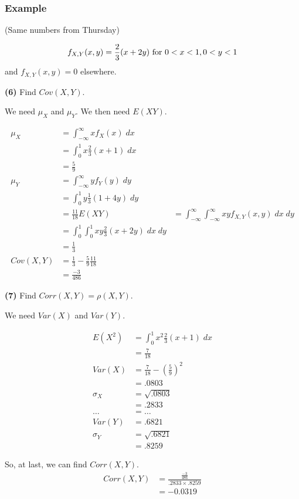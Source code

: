 \documentclass[12pt]{article}
\begin{document}
\subsubsection{Example}
(Same numbers from Thursday)

\[
    f_{X,Y} (x,y) = \frac{2}{3} (x + 2y) \textnormal{ for } 0 < x < 1, 0 < y < 1
\]
and $f_{X,Y} (x,y) = 0$ elsewhere.

\textbf{(6)} Find $Cov(X,Y)$.

We need $\mu_X$ and $\mu_Y$. We then need $E(XY)$.

\begin{align*}
    \mu_X &= \int_{-\infty}^{\infty} x f_X (x) \; dx \\
        &= \int_0^1 x \frac{2}{3} (x + 1) \; dx \\
        &= \frac{5}{9} \\
    \mu_Y &= \int_{-\infty}^{\infty} y f_Y (y) \; dy \\
        &= \int_0^1 y \frac{1}{3} (1 + 4y) \; dy \\
        &= \frac{11}{18}
    E(XY) &= \int_{-\infty}^{\infty} \int_{-\infty}^{\infty} x y f_{X,Y} (x,y) \; dx \; dy \\
        &= \int_0^1 \int_0^1 x y \frac{2}{3} (x + 2y) \; dx \; dy \\
        &= \frac{1}{3} \\
    Cov(X,Y) &= \frac{1}{3} - \frac{5}{9} \frac{11}{18} \\
        &= \frac{-3}{486}
\end{align*}

\textbf{(7)} Find $Corr(X,Y) = \rho (X,Y)$.

We need $Var(X)$ and $Var(Y)$. 

\begin{align*}
    E(X^2) &= \int_0^1 x^2 \frac{2}{3} (x+1) \; dx \\
        &= \frac{7}{18} \\
    Var(X) &= \frac{7}{18} - (\frac{5}{9})^2 \\
        &= .0803 \\
    \sigma_X &= \sqrt{.0803} \\
        &= .2833 \\
    \dots &= \dots \\
    Var(Y) &= .6821 \\
    \sigma_Y &= \sqrt{.6821} \\
        &= .8259
\end{align*}

So, at last, we can find $Corr(X,Y)$.
\begin{align*}
    Corr(X,Y) &= \frac{\frac{-3}{486}}{.2833 \times .8259} \\
        &= -0.0319
\end{align*}
\end{document}
